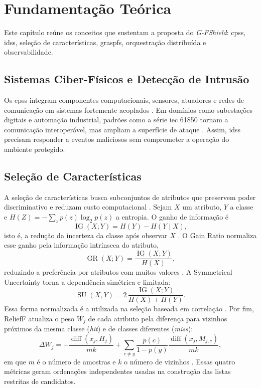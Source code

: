 \chapter{Fundamentação Teórica}
\label{chapter:fundamentacao}

Este capítulo reúne os conceitos que sustentam a proposta do \textit{G-FShield}: \acp{cps}, \acp{ids}, seleção de características, \ac{graspfs}, orquestração distribuída e observabilidade.

\section{Sistemas Ciber-Físicos e Detecção de Intrusão}

Os \acp{cps} integram componentes computacionais, sensores, atuadores e redes de comunicação em sistemas fortemente acoplados \cite{Cardenas2009,Mitchell2014}. Em domínios como subestações digitais e automação industrial, padrões como a série \ac{iec} 61850 tornam a comunicação interoperável, mas ampliam a superfície de ataque \cite{iec61850,mackiewicz2006overview,aftab2020iec}. Assim, \acp{ids} precisam responder a eventos maliciosos sem comprometer a operação do ambiente protegido.

\section{Seleção de Características}

A seleção de características busca subconjuntos de atributos que preservem poder discriminativo e reduzam custo computacional \cite{Hall1999,Saeys2007,guyon2003introduction}. Sejam $X$ um atributo, $Y$ a classe e $H(Z)=-\sum_z p(z)\log_2p(z)$ a entropia. O ganho de informação é
\begin{equation}
  \operatorname{IG}(X;Y)=H(Y)-H(Y\mid X),
\end{equation}
isto é, a redução da incerteza da classe após observar $X$ \cite{Quinlan1986InformationGain}. O Gain Ratio normaliza esse ganho pela informação intrínseca do atributo,
\begin{equation}
  \operatorname{GR}(X;Y)=\frac{\operatorname{IG}(X;Y)}{H(X)},
\end{equation}
reduzindo a preferência por atributos com muitos valores \cite{Quinlan1993C45}. A Symmetrical Uncertainty torna a dependência simétrica e limitada:
\begin{equation}
  \operatorname{SU}(X,Y)=2\,\frac{\operatorname{IG}(X;Y)}{H(X)+H(Y)}.
\end{equation}
Essa forma normalizada é a utilizada na seleção baseada em correlação \cite{Hall1999}.
Por fim, ReliefF atualiza o peso $W_j$ de cada atributo pela diferença para vizinhos próximos da mesma classe (\textit{hit}) e de classes diferentes (\textit{miss}):
\begin{equation}
 \Delta W_j=-\frac{\operatorname{diff}(x_j,H_j)}{mk}+\sum_{c\neq y}\frac{p(c)}{1-p(y)}\frac{\operatorname{diff}(x_j,M_{j,c})}{mk},
\end{equation}
em que $m$ é o número de amostras e $k$ o número de vizinhos \cite{kononenko1994estimating,robnik2003theoretical}. Essas quatro métricas geram ordenações independentes usadas na construção das listas restritas de candidatos.

